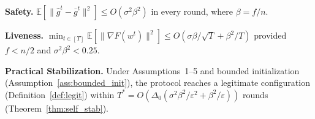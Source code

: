 \noindent\textbf{Safety.} $\mathbb{E}[\|\hat{g}^t - \bar{g}^t\|^2] \leq O(\sigma^2\beta^2)$ in every round, where $\beta = f/n$.

\noindent\textbf{Liveness.} $\min_{t \in [T]}\mathbb{E}[\|\nabla F(w^t)\|^2] \leq O(\sigma\beta/\sqrt{T} + \beta^2/T)$
provided $f < n/2$ and $\sigma^2\beta^2 < 0.25$.

\noindent\textbf{Practical Stabilization.} Under Assumptions~1--5 and bounded initialization
(Assumption~\ref{ass:bounded_init}), the protocol reaches a legitimate configuration
(Definition~\ref{def:legit}) within
$T^* = O(\Delta_0(\sigma^2\beta^2/\varepsilon^2 + \beta^2/\varepsilon))$ rounds
(Theorem~\ref{thm:self_stab}).
